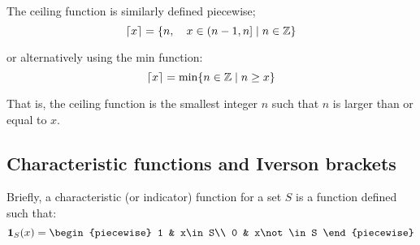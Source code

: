 The ceiling function is similarly defined piecewise;
$$
\lceil x\rceil=\{n,\quad x\in(n-1,n]\mid n\in\mathbb{Z}\}
$$

or alternatively using the min function:
$$
\lceil x\rceil=\min\{n\in\mathbb{Z}\mid n\geq x\}
$$

That is, the ceiling function is the smallest integer $n$ such that $n$ is larger than or equal to $x$.

\subsection{Characteristic functions and Iverson brackets}
Briefly, a characteristic (or indicator) function for a set $S$ is a function defined such that:
$$
    \mathbf{1}_{S}(x)=\begin{piecewise}
        1 & x\in S\\
        0 & x\not\in S
    \end{piecewise}
$$

